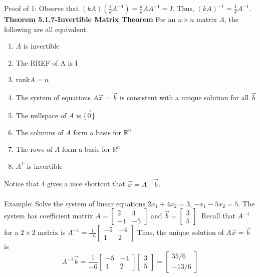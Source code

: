 \documentclass[10pt,letter]{article}
\begin{document}
Proof of 1: Observe that $(kA)(\frac{1}{k}A^{-1})=\frac{k}{k}AA^{-1}=I$. Thus, $(kA)^{-1}=\frac{1}{k}A^{-1}$. \\ 
\textbf{Theorem 5.1.7-Invertible Matrix Theorem} For an $n\times n$ matrix $A$, the following are all equivalent. \begin{enumerate}
    \item $A$ is invertible 
    \item The RREF of A is I 
    \item rank$A=n$ 
    \item The system of equations $A\vec{x}=\vec{b}$ is consistent with a unique solution for all $\vec{b}$ 
    \item The nullspace of $A$ is $\{\vec{0}\}$ 
    \item The columns of $A$ form a basis for $\mathbb{R}^n$ 
    \item The rows of $A$ form a basis for $\mathbb{R}^n$ 
    \item $A^T$ is invertible 
\end{enumerate} Notice that 4 gives a nice shortcut that $\vec{x}=A^{-1}\vec{b}$. \\ \\ 
Example: Solve the system of linear equations $2x_1+4x_2=3$, $-x_1-5x_2=5$. The system has coefficient matrix $A=\begin{bmatrix}2&4\\-1&-5\end{bmatrix}$ and $\vec{b}=\begin{bmatrix}3\\5\end{bmatrix}$. Recall that $A^{-1}$ for a $2\times 2$ matrix is $A^{-1}=\frac{1}{-6}\begin{bmatrix}-5&-4\\1&2\end{bmatrix}$ Thus, the unique solution of $A\vec{x}=\vec{b}$ is $$A^{-1}\vec{b}=\frac{1}{-6}\begin{bmatrix}-5&-4\\1&2\end{bmatrix}\begin{bmatrix}3\\5\end{bmatrix}=\begin{bmatrix}35/6\\-13/6\end{bmatrix}$$ 
\end{document}
